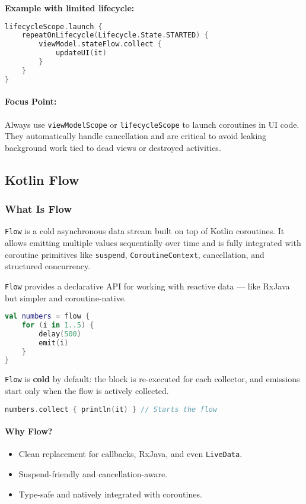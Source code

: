 \documentclass[a4paper,12pt]{article}
\begin{document}
\textbf{Example with limited lifecycle:}
\begin{lstlisting}[language=Kotlin]
lifecycleScope.launch {
    repeatOnLifecycle(Lifecycle.State.STARTED) {
        viewModel.stateFlow.collect {
            updateUI(it)
        }
    }
}
\end{lstlisting}

\paragraph{Focus Point:}  
Always use \texttt{viewModelScope} or \texttt{lifecycleScope} to launch coroutines in UI code. They automatically handle cancellation and are critical to avoid leaking background work tied to dead views or destroyed activities.


\subsection{Kotlin Flow}
\label{subsec:kotlin_flow}

\subsubsection{What Is Flow}

\texttt{Flow} is a cold asynchronous data stream built on top of Kotlin coroutines. It allows emitting multiple values sequentially over time and is fully integrated with coroutine primitives like \texttt{suspend}, \texttt{CoroutineContext}, cancellation, and structured concurrency.

\texttt{Flow} provides a declarative API for working with reactive data — like RxJava but simpler and coroutine-native.

\begin{lstlisting}[language=Kotlin]
val numbers = flow {
    for (i in 1..5) {
        delay(500)
        emit(i)
    }
}
\end{lstlisting}

\texttt{Flow} is \textbf{cold} by default: the block is re-executed for each collector, and emissions start only when the flow is actively collected.

\begin{lstlisting}[language=Kotlin]
numbers.collect { println(it) } // Starts the flow
\end{lstlisting}

\paragraph{Why Flow?}
\begin{itemize}
  \item Clean replacement for callbacks, RxJava, and even \texttt{LiveData}.
  \item Suspend-friendly and cancellation-aware.
  \item Type-safe and natively integrated with coroutines.
\end{itemize}
\end{document}
